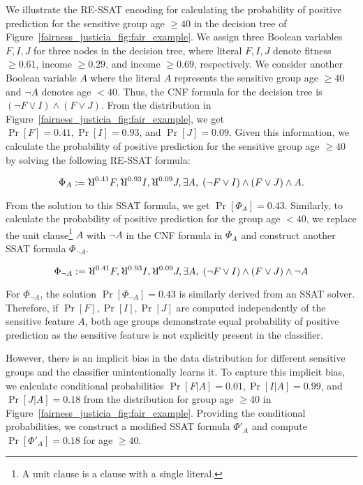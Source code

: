 \begin{example}
	\normalfont
	\label{fairness_justicia_example:re_ssat}
	We illustrate the RE-SSAT encoding for calculating the probability of positive prediction for the sensitive group age $ \ge 40 $ in the decision tree of Figure~\ref{fairness_justicia_fig:fair_example}. We assign three Boolean variables $ F,I,J $ for three nodes in the decision tree, where literal $ F,I,J $ denote fitness $ \ge 0.61 $, income $ \ge 0.29 $, and income $ \ge 0.69 $, respectively. We consider another Boolean variable $A$  where the literal $ A $ represents the sensitive group age $ \ge 40 $ and $ \neg A $ denotes age $ < 40 $. Thus, the CNF formula  for the decision tree is $ (\neg F \vee I) \wedge (F \vee J) $. From the distribution in Figure~\ref{fairness_justicia_fig:fair_example}, we get $ \Pr[F] = 0.41, \Pr[I] = 0.93 $, and $ \Pr[J] = 0.09 $. Given this information, we calculate the probability of positive prediction for the sensitive group age $ \ge 40 $ by solving the following RE-SSAT formula:
	
	\begin{equation}
	\Phi_A := \R^{0.41}F, \R^{0.93}I, \R^{0.09}J, \exists A, \; (\neg F \vee I) \wedge (F \vee J) \wedge A.\notag
	\end{equation}
	
	From the solution to this SSAT formula, we get $ \Pr[\Phi_A] = 0.43 $. Similarly, to calculate the probability of positive prediction for the group age $ < 40 $, we replace the unit clause\footnote{A unit clause is a clause with a single literal.} $ A $ with $ \neg A $ in the CNF formula in $ \Phi_A $ and construct another SSAT formula $ \Phi_{\neg A} $. 
	
	\[ \Phi_{\neg A} := \R^{0.41}F, \R^{0.93}I, \R^{0.09}J, \exists A, \; (\neg F \vee I) \wedge (F \vee J) \wedge \neg A \]
	
	For $ \Phi_{\neg A} $, the solution $ \Pr[\Phi_{\neg A}] = 0.43 $ is similarly derived from an SSAT solver. 
	Therefore, if $\Pr[F], \Pr[I], \Pr[J]$ are computed independently of the sensitive feature $A$, both age groups demonstrate equal probability of positive prediction as the sensitive feature is not explicitly present in the classifier. 

	However, there is an implicit bias in the data distribution for different sensitive groups and the classifier unintentionally learns it. To capture this implicit bias, we calculate conditional probabilities  $ \Pr[F|A] = 0.01, \Pr[I|A] = 0.99 $, and $ \Pr[J|A] = 0.18 $ from the distribution for group age $ \ge 40 $ in Figure~\ref{fairness_justicia_fig:fair_example}. Providing the conditional probabilities, we construct a modified SSAT formula $\Phi'_A $ and compute $ \Pr[\Phi'_A] = 0.18 $ for age $ \ge 40 $. 
	

\end{example}
